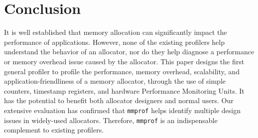 \section{Conclusion}
\label{sec:conclusion}

It is well established that memory allocation can significantly impact the performance of applications. However, none of the existing profilers help understand the behavior of an allocator, nor do they help diagnose a performance or memory overhead issue caused by the allocator. This paper designs the first general profiler to profile the performance, memory overhead, scalability, and application-friendliness of a memory allocator, through the use of simple counters, timestamp registers, and hardware Performance Monitoring Units. It has the potential to benefit both allocator designers and normal users. Our extensive evaluation has confirmed that \texttt{mmprof} helps identify multiple design issues in widely-used allocators. Therefore, \texttt{mmprof} is an indispensable complement to existing profilers. 
